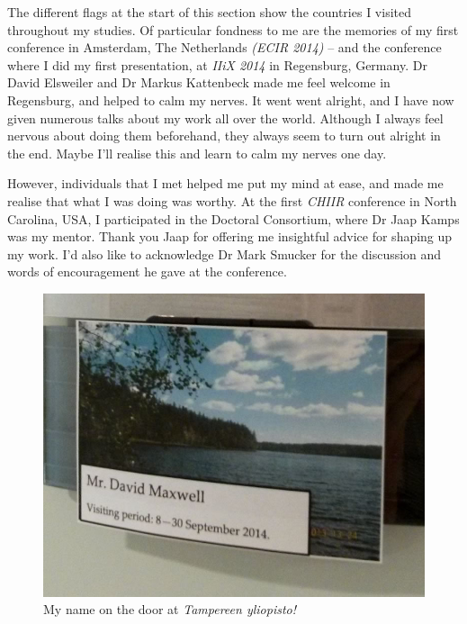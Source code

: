 \begin{preamble}
The different flags at the start of this section show the countries I visited throughout my studies. Of particular fondness to me are the memories of my first conference in Amsterdam, The Netherlands \emph{(ECIR 2014)} -- and the conference where I did my first presentation, at \emph{IIiX 2014} in Regensburg, Germany. Dr David Elsweiler and Dr Markus Kattenbeck made me feel welcome in Regensburg, and helped to calm my nerves. It went went alright, and I have now given numerous talks about my work all over the world. Although I always feel nervous about doing them beforehand, they always seem to turn out alright in the end. Maybe I'll realise this and learn to calm my nerves one day.

However, individuals that I met helped me put my mind at ease, and made me realise that what I was doing was worthy. At the first \emph{CHIIR} conference in North Carolina, USA, I participated in the Doctoral Consortium, where Dr Jaap Kamps was my mentor. Thank you Jaap for offering me insightful advice for shaping up my work. I'd also like to acknowledge Dr Mark Smucker for the discussion and words of encouragement he gave at the conference.

\renewcommand{\figurename}{Picture}
\begin{figure}
    \begin{center}
    \vspace*{-9mm}
    \includegraphics[width=1\textwidth]{figures/ch0-tampere.jpg}
    \end{center}
    \vspace*{-6mm}
    \caption[]{My name on the door at \emph{Tampereen yliopisto!}}
    \label{fig:acks_finland}
\end{figure}
\renewcommand{\figurename}{Figure}


\end{preamble}

